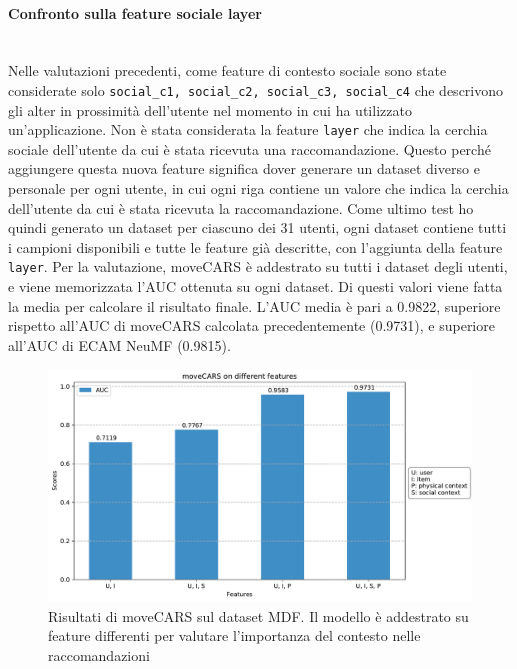 \documentclass[12pt,italian]{report}
\newcommand{\myparagraph}[1]{\paragraph{#1}\mbox{}\\} %
\begin{document}
\myparagraph{Confronto sulla feature sociale layer}
Nelle valutazioni precedenti, come feature di contesto sociale sono state considerate solo \texttt{social\_c1, social\_c2, social\_c3, social\_c4} che descrivono gli alter in prossimità dell'utente nel momento in cui ha utilizzato un'applicazione. Non è stata considerata la feature \texttt{layer} che indica la cerchia sociale dell'utente da cui è stata ricevuta una raccomandazione. Questo perché aggiungere questa nuova feature significa dover generare un dataset diverso e personale per ogni utente, in cui ogni riga contiene un valore che indica la cerchia dell'utente da cui è stata ricevuta la raccomandazione. Come ultimo test ho quindi generato un dataset per ciascuno dei 31 utenti, ogni dataset contiene tutti i campioni disponibili e tutte le feature già descritte, con l'aggiunta della feature \texttt{layer}. Per la valutazione, moveCARS è addestrato su tutti i dataset degli utenti, e viene memorizzata l'AUC ottenuta su ogni dataset. Di questi valori viene fatta la media per calcolare il risultato finale. L'AUC media è pari a 0.9822, superiore rispetto all'AUC di moveCARS calcolata precedentemente (0.9731), e superiore all'AUC di ECAM NeuMF (0.9815).

\begin{figure}
  \centering
  \includegraphics[width=\linewidth]{immagini/moveCARS_diff_features.pdf}
  \caption{Risultati di moveCARS sul dataset MDF. Il modello è addestrato su feature differenti per valutare l'importanza del contesto nelle raccomandazioni}
  \label{fig:result-movecars-mdf}
\end{figure}
\end{document}
